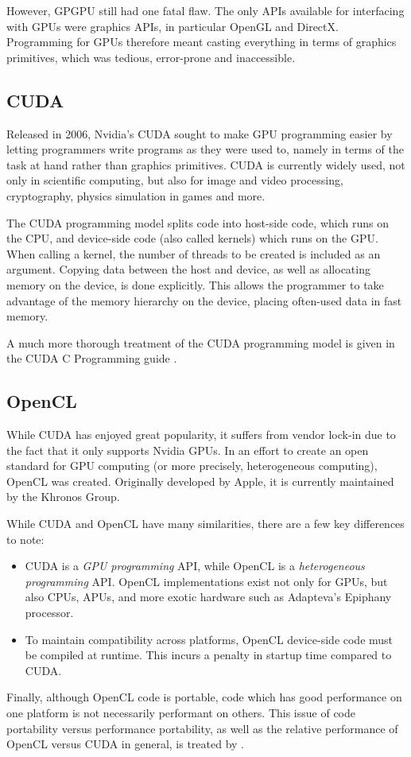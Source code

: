 However, GPGPU still had one fatal flaw. The only APIs available for interfacing with GPUs were graphics APIs, in particular OpenGL and DirectX. Programming for GPUs therefore meant casting everything in terms of graphics primitives, which was tedious, error-prone and inaccessible.

\subsection{CUDA}
Released in 2006, Nvidia's CUDA sought to make GPU programming easier by letting programmers write programs as they were used to, namely in terms of the task at hand rather than graphics primitives. CUDA is currently widely used, not only in scientific computing, but also for image and video processing, cryptography, physics simulation in games and more.

The CUDA programming model splits code into host-side code, which runs on the CPU, and device-side code (also called kernels) which runs on the GPU. When calling a kernel, the number of threads to be created is included as an argument. Copying data between the host and device, as well as allocating memory on the device, is done explicitly. This allows the programmer to take advantage of the memory hierarchy on the device, placing often-used data in fast memory.

A much more thorough treatment of the CUDA programming model is given in the CUDA C Programming guide \citep{nvidia2014programming}.

\subsection{OpenCL}
While CUDA has enjoyed great popularity, it suffers from vendor lock-in due to the fact that it only supports Nvidia GPUs. In an effort to create an open standard for GPU computing (or more precisely, heterogeneous computing), OpenCL was created. Originally developed by Apple, it is currently maintained by the Khronos Group.

While CUDA and OpenCL have many similarities, there are a few key differences to note:
\begin{itemize}
\item CUDA is a \emph{GPU programming} API, while OpenCL is a \emph{heterogeneous programming} API. OpenCL implementations exist not only for GPUs, but also CPUs, APUs, and more exotic hardware such as Adapteva's Epiphany processor.
\item To maintain compatibility across platforms, OpenCL device-side code must be compiled at runtime. This incurs a penalty in startup time compared to CUDA.
\end{itemize}
Finally, although OpenCL code is portable, code which has good performance on one platform is not necessarily performant on others. This issue of code portability versus performance portability, as well as the relative performance of OpenCL versus CUDA in general, is treated by \citet{weber2011comparing}.

